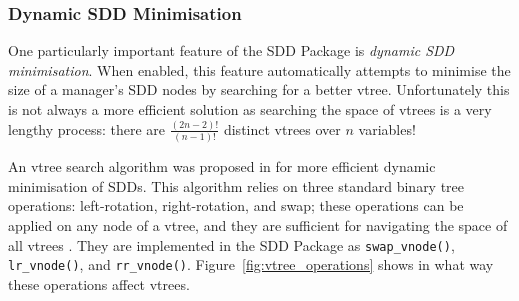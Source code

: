 \documentclass[11pt]{article}
\begin{document}
\subsubsection{Dynamic SDD Minimisation}
\label{sdd_dao_algo}
One particularly important feature of the SDD Package is \textit{dynamic SDD minimisation}. When enabled, this feature automatically attempts to minimise the size of a manager's SDD nodes by searching for a better vtree. Unfortunately this is not always a more efficient solution as searching the space of vtrees is a very lengthy process: there are $\frac{(2n -2)!}{(n-1)!}$ distinct vtrees over $n$ variables!

An vtree search algorithm was proposed in \cite{sdd_3} for more efficient dynamic minimisation of SDDs. This algorithm relies on three standard binary tree operations: left-rotation, right-rotation, and swap; these operations can be applied on any node of a vtree, and they are sufficient for navigating the space of all vtrees \cite{knuth}. They are implemented in the SDD Package as \texttt{swap\_vnode()}, \texttt{lr\_vnode()}, and \texttt{rr\_vnode()}. Figure~\ref{fig:vtree_operations} shows in what way these operations affect vtrees.
\end{document}

